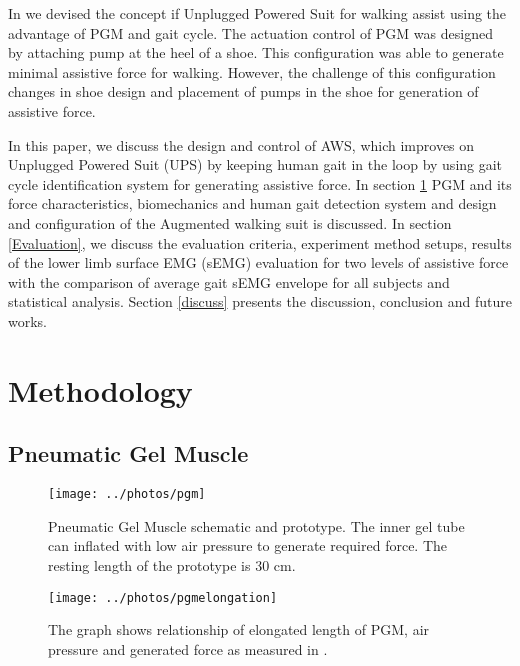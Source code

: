 \documentclass[letterpaper, 10 pt, conference]{ieeeconf}  %
\begin{document}
In \cite{9} we devised the concept if Unplugged Powered Suit for walking assist using the advantage of PGM and gait cycle. The actuation control of PGM was designed by attaching pump at the heel of a shoe. This configuration was able to generate minimal assistive force for walking. However, the challenge of this configuration changes in shoe design and placement of pumps in the shoe for generation of assistive force. 

In this paper, we discuss the design and control of AWS, which improves on Unplugged Powered Suit (UPS) by keeping human gait in the loop by using gait cycle identification system for generating assistive force. In section \ref{methodology} PGM and its force characteristics, biomechanics and human gait detection system and design and configuration of the Augmented walking suit is discussed. In section \ref{Evaluation}, we discuss the evaluation criteria, experiment method setups, results of the lower limb surface EMG (sEMG) evaluation for two levels of assistive force with the comparison of average gait sEMG envelope for all subjects and statistical analysis. Section \ref{discuss} presents the discussion, conclusion and future works.


\section{Methodology} \label{methodology}

\subsection{Pneumatic Gel Muscle} \label{pgm}
\begin{figure}
	\centering
	\texttt{[image: ../photos/pgm]}
	\caption{Pneumatic Gel Muscle schematic and prototype. The inner gel tube can inflated with low air pressure to generate required force. The resting length of the prototype is 30 cm.}
	\label{fig:pgm}
\end{figure}
\begin{figure}
	\centering
	\texttt{[image: ../photos/pgmelongation]}
	\caption{The graph shows relationship of elongated length of PGM, air pressure and generated force as measured in \cite{7}.}
	\label{fig:pgmelongationratio}
\end{figure}
\end{document}
